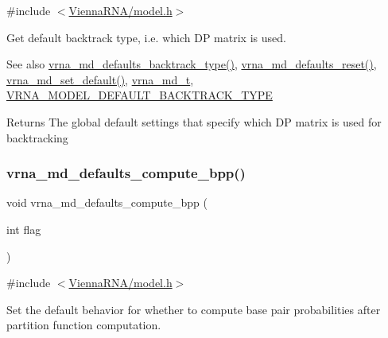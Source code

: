{\ttfamily \#include $<$\hyperlink{model_8h}{Vienna\+R\+N\+A/model.\+h}$>$}



Get default backtrack type, i.\+e. which DP matrix is used. 

\begin{DoxySeeAlso}{See also}
\hyperlink{group__model__details_ga68305274de96b56b7799575e222560d8}{vrna\+\_\+md\+\_\+defaults\+\_\+backtrack\+\_\+type()}, \hyperlink{group__model__details_ga70834424cf804d149937de89f80ceb45}{vrna\+\_\+md\+\_\+defaults\+\_\+reset()}, \hyperlink{group__model__details_ga8ac6ff84936282436f822644bf841f66}{vrna\+\_\+md\+\_\+set\+\_\+default()}, \hyperlink{group__model__details_ga1f8a10e12a0a1915f2a4eff0b28ea17c}{vrna\+\_\+md\+\_\+t}, \hyperlink{group__model__details_gad0e81fcaca53c4a826c68e0796de2afb}{V\+R\+N\+A\+\_\+\+M\+O\+D\+E\+L\+\_\+\+D\+E\+F\+A\+U\+L\+T\+\_\+\+B\+A\+C\+K\+T\+R\+A\+C\+K\+\_\+\+T\+Y\+PE} 
\end{DoxySeeAlso}
\begin{DoxyReturn}{Returns}
The global default settings that specify which DP matrix is used for backtracking 
\end{DoxyReturn}
\mbox{\label{group__model__details_gaf1b5db10f1f476767f9a95f8a78e3132}} 
\subsubsection{\texorpdfstring{vrna\+\_\+md\+\_\+defaults\+\_\+compute\+\_\+bpp()}{vrna\_md\_defaults\_compute\_bpp()}}
{\footnotesize\ttfamily void vrna\+\_\+md\+\_\+defaults\+\_\+compute\+\_\+bpp (\begin{DoxyParamCaption}\item[{int}]{flag }\end{DoxyParamCaption})}



{\ttfamily \#include $<$\hyperlink{model_8h}{Vienna\+R\+N\+A/model.\+h}$>$}



Set the default behavior for whether to compute base pair probabilities after partition function computation. 

